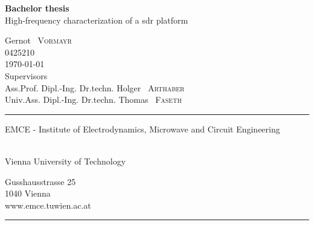 \documentclass[12pt,a4paper,parskip=full,abstracton]{scrartcl}
\begin{document}
\begin{titlepage}
    \enlargethispage{1cm}
    \centering
    \vspace*{5cm}
    {\Huge \textbf{Bachelor thesis}}\\
    \vspace*{1cm}
    {\Large High-frequency characterization of a \gls{sdr} platform}

    \vspace*{2cm}
    {\large Gernot ~\textsc{Vormayr} ~\\ 0425210 } ~\\ 

    \vspace*{2cm}
    {\today } ~\\ 

    \vfill
    {Supervisors} ~\\\vspace*{0.1cm}
    {Ass.Prof. Dipl.-Ing. Dr.techn. \large Holger ~\textsc{Arthaber}} ~\\
    {Univ.Ass. Dipl.-Ing. Dr.techn. \large Thomas ~\textsc{Faseth}}
    \vspace*{2cm}

    \rule{\linewidth}{0.4pt}
    \begin{minipage}[t]{0.55\linewidth}
        \flushleft
        \begin{large}
            EMCE - Institute of Electrodynamics, Microwave and Circuit Engineering
        \end{large}\\
        Vienna University of Technology
    \end{minipage}
    \hfill
    \begin{minipage}[t]{0.27\linewidth}
        \flushright
        Gusshausstrasse 25\\
        1040 Vienna\\
        www.emce.tuwien.ac.at
    \end{minipage}
    \vspace*{-3pt}
    \rule{\linewidth}{0.4pt}
    \clearpage
\end{titlepage}
\end{document}
